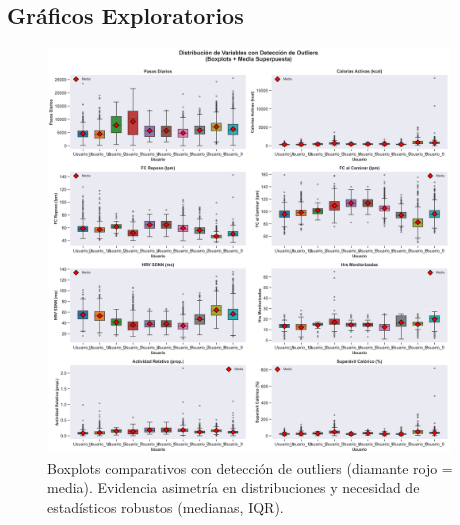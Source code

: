 \documentclass[12pt,letterpaper,twoside]{report}
\begin{document}
\subsection{Gráficos Exploratorios}

\begin{figure}[htbp]
\centering
\includegraphics[width=0.95\textwidth]{../analisis_u/descriptivos_visuales/boxplots_comparativos.png}
\caption{Boxplots comparativos con detección de outliers (diamante rojo = media). Evidencia asimetría en distribuciones y necesidad de estadísticos robustos (medianas, IQR).}
\label{fig:boxplots_comparativos}
\end{figure}
\end{document}

